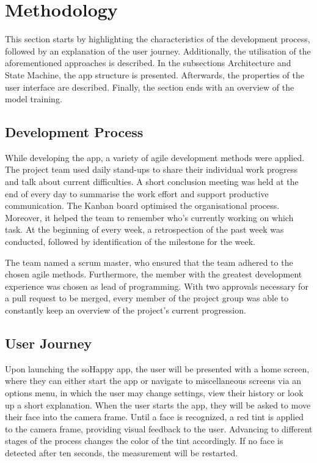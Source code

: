 \section{Methodology} \label{sec:methodology}

This section starts by highlighting the characteristics of the development process, followed by
an explanation of the user journey. Additionally, the utilisation of the aforementioned
approaches is described.
In the subsections Architecture and State Machine, the app structure is presented. Afterwards, the properties of the user interface are described. Finally, the section ends with an overview of the model training.

\subsection{Development Process}

While developing the app, a variety of agile development methods were applied.
The project team used daily stand-ups to share their individual work progress and talk about current difficulties.
A short conclusion meeting was held at the end of every day to summarise the work effort and support productive communication.
The Kanban board optimised the organisational process. Moreover, it helped the team to remember who's currently working on which task.
At the beginning of every week, a retrospection of the past week was conducted, followed by identification of the milestone for the week.

The team named a scrum master, who ensured that the team adhered to the chosen agile methods. Furthermore, the member with the greatest development experience was chosen as lead of programming.
With two approvals necessary for a pull request to be merged, every member of the project group was able to constantly keep an overview of the project's current progression.

\subsection{User Journey} \label{sec:user_journey}
Upon launching the soHappy app, the user will be presented with a home screen, where they can either start the app or navigate to miscellaneous screens via an options menu, in which the user may change settings, view their history or look up a short explanation.
When the user starts the app, they will be asked to move their face into the camera frame. Until a face is recognized, a red tint is applied to the camera frame, providing visual feedback to the user. Advancing to different stages of the process changes the color of the tint accordingly. If no face is detected after ten seconds, the measurement will be restarted.

